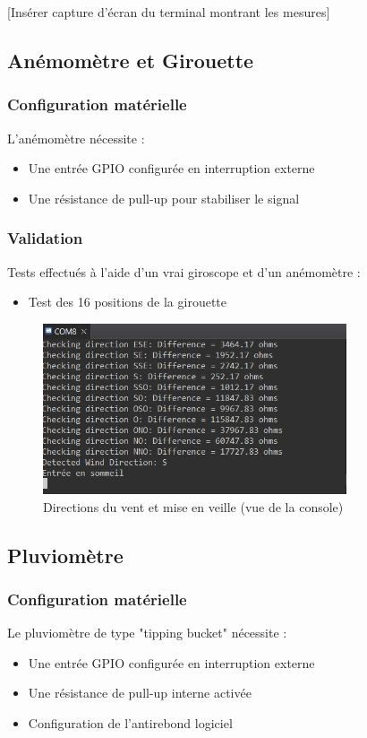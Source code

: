 \documentclass[12pt]{article}
\begin{document}
[Insérer capture d'écran du terminal montrant les mesures]

\subsection{Anémomètre et Girouette}
\subsubsection{Configuration matérielle}
L'anémomètre nécessite :
\begin{itemize}
    \item Une entrée GPIO configurée en interruption externe
    \item Une résistance de pull-up pour stabiliser le signal
\end{itemize}

\subsubsection{Validation}
Tests effectués à l'aide d'un vrai giroscope et d'un anémomètre :
\begin{itemize}
    \item Test des 16 positions de la girouette
\end{itemize}

\begin{figure}[H]
    \capstart
    \centering
    \includegraphics[width=0.8\textwidth]{./images/console_direction_du_vent_et_miseenveille.png}
    \caption{Directions du vent et mise en veille (vue de la console)} 
    \label{fig:girouette_positions}
\end{figure}

\subsection{Pluviomètre}
\subsubsection{Configuration matérielle}
Le pluviomètre de type "tipping bucket" nécessite :
\begin{itemize}
    \item Une entrée GPIO configurée en interruption externe
    \item Une résistance de pull-up interne activée
    \item Configuration de l'antirebond logiciel
\end{itemize}
\end{document}
